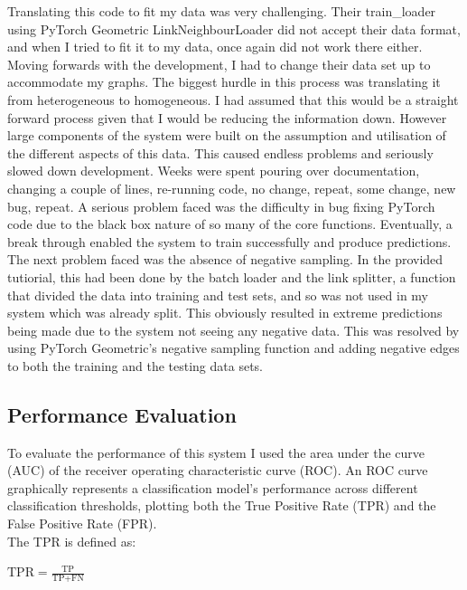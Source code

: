 \documentclass{l4proj}
\begin{document}
Translating this code to fit my data was very challenging. Their train\_loader using PyTorch Geometric LinkNeighbourLoader did not accept their data format, and when I tried to fit it to my data, once again did not work there either. Moving forwards with the development, I had to change their data set up to accommodate my graphs. The biggest hurdle in this process was translating it from heterogeneous to homogeneous. I had assumed that this would be a straight forward process given that I would be reducing the information down. However large components of the system were built on the assumption and utilisation of the different aspects of this data. This caused endless problems and seriously slowed down development. Weeks were spent pouring over documentation, changing a couple of lines, re-running code, no change, repeat, some change, new bug, repeat. A serious problem faced was the difficulty in bug fixing PyTorch code due to the black box nature of so many of the core functions. Eventually, a break through enabled the system to train successfully and produce predictions. \\

The next problem faced was the absence of negative sampling. In the provided tutiorial, this had been done by the batch loader and the link splitter, a function that divided the data into training and test sets, and so was not used in my system which was already split. This obviously resulted in extreme predictions being made due to the system not seeing any negative data. This was resolved by using PyTorch Geometric's negative sampling function and adding negative edges to both the training and the testing data sets. \\

\subsection{Performance Evaluation}

To evaluate the performance of this system I used the area under the curve (AUC) of the receiver operating characteristic curve (ROC). An ROC curve graphically represents a classification model's performance across different classification thresholds, plotting both the True Positive Rate (TPR) and the False Positive Rate (FPR). \\

The TPR is defined as: 

\begin{center}
    $\text{TPR} = \frac{\text{TP}}{\text{TP} + \text{FN}}$ \\
\end{center}
\end{document}
